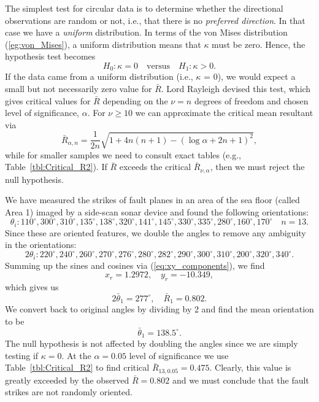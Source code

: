 	The simplest test for circular data is to determine whether the directional observations are 
random or not, i.e., that there is no \emph{preferred direction}.  In that case we have a \emph{uniform} distribution.
In terms of the von Mises distribution (\ref{eg:von_Mises}), a uniform distribution means that $ \kappa$ must be zero.
Hence, the hypothesis test becomes
\begin{equation}
H_0: \kappa =0 \quad \mbox{versus} \quad H_1: \kappa>0.
\end{equation}	 
If the data came from a uniform distribution (i.e., $ \kappa$ = 0), we would expect a small but not necessarily zero value for $\bar{R}$.  Lord Rayleigh devised this
test, which gives critical values for $\bar{R}$ depending on the  $\nu = n$ degrees of freedom and chosen level of significance, $\alpha$.
For $\nu \geq 10$ we can approximate the critical mean resultant via
\begin{equation}
	\bar{R}_{\alpha,n} = \frac{1}{2n}\sqrt{1+4n(n+1)-\left (\log \alpha + 2n + 1 \right)^2},
\end{equation}
while for smaller samples we need to consult exact tables (e.g., Table~\ref{tbl:Critical_R2}).
If $\bar{R}$ exceeds the critical $\bar{R}_{\nu, \alpha}$, then we must reject the null hypothesis.
\begin{example}
We have measured the strikes of fault planes in an area 
of the sea floor (called Area 1) imaged by a side-scan sonar device and found the following orientations:
$$
 \theta_i : 110^{\circ}, 300^{\circ}, 310^{\circ}, 135^{\circ}, 138^{\circ}, 320^{\circ}, 141^{\circ}, 145^{\circ}, 330^{\circ}, 335^{\circ}, 280^{\circ}, 160^{\circ}, 170^{\circ} \quad n=13.
$$
Since these are oriented features, we double the angles to remove any ambiguity in the orientations:
$$
 2\theta_i : 220^{\circ}, 240^{\circ}, 260^{\circ}, 270^{\circ}, 276^{\circ}, 280^{\circ}, 282^{\circ}, 290^{\circ}, 300^{\circ}, 310^{\circ}, 200^{\circ}, 320^{\circ}, 340^{\circ}.
$$
Summing up the sines and cosines via (\ref{eq:xy_components}), we find
\begin{equation}
x_r = 1.2972, \quad y_r = -10.349,		 
\end{equation}
which gives us
\begin{equation}
2\bar{\theta}_1 = 277^{\circ}, \quad \bar{R}_1 = 0.802.
\end{equation}  
We convert back to original angles by dividing by 2 and find the mean orientation to be
\begin{equation}
\bar{\theta}_1 = 138.5^{\circ}.
\end{equation}	 
The null hypothesis is not affected by doubling the angles since we are simply testing if $\kappa = 0$.
At the $\alpha = 0.05$ level of significance we use Table~\ref{tbl:Critical_R2} to find critical $\bar{R}_{13,0.05} = 0.475$.  Clearly, this value is greatly
exceeded by the observed $\bar{R} = 0.802$ and we must conclude that the fault strikes are not randomly oriented.
\end{example}

